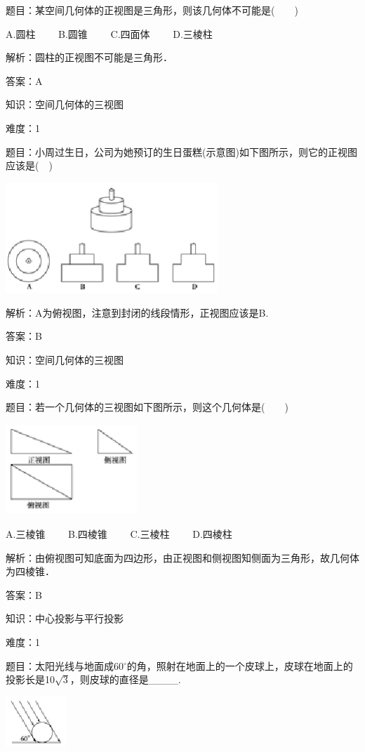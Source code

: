 \documentclass{article} %
\begin{document}
题目：某空间几何体的正视图是三角形，则该几何体不可能是(　　)

A.圆柱　　 B.圆锥　　 C.四面体　　 D.三棱柱

解析：圆柱的正视图不可能是三角形．

答案：A

知识：空间几何体的三视图

难度：1

题目：小周过生日，公司为她预订的生日蛋糕(示意图)如下图所示，则它的正视图应该是(　)

\includegraphics*[width=3.15in, height=1.64in, keepaspectratio=false]{image30}

解析：A为俯视图，注意到封闭的线段情形，正视图应该是B.

答案：B

知识：空间几何体的三视图

难度：1

题目：若一个几何体的三视图如下图所示，则这个几何体是(　　)

\includegraphics*[width=1.95in, height=1.34in, keepaspectratio=false]{image31}

A.三棱锥　　 B.四棱锥　　 C.三棱柱　　 D.四棱柱

解析：由俯视图可知底面为四边形，由正视图和侧视图知侧面为三角形，故几何体为四棱锥．

答案：B

知识：中心投影与平行投影

难度：1

题目：太阳光线与地面成60$\mathrm{{}^\circ}$的角，照射在地面上的一个皮球上，皮球在地面上的投影长是10$\sqrt{3}$，则皮球的直径是\_\_\_\_.

\includegraphics*[width=0.90in, height=0.75in, keepaspectratio=false]{image32}
\end{document}
